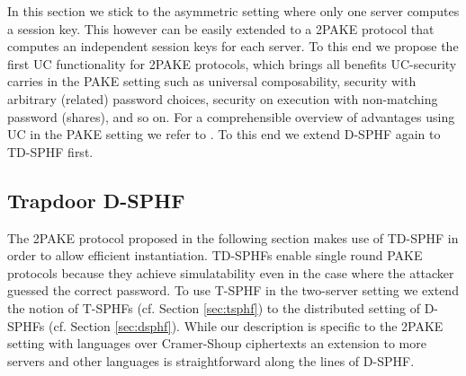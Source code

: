 In this section we stick to the asymmetric setting where only one server computes a session key.
This however can be easily extended to a \ac{2PAKE} protocol that computes an independent session keys for each server.
To this end we propose the first \ac{UC} functionality for \ac{2PAKE} protocols, which brings all benefits \ac{UC}-security carries in the \ac{PAKE} setting such as universal composability, security with arbitrary (related) password choices, security on execution with non-matching password (shares), and so on.
For a comprehensible overview of advantages using \ac{UC} in the \ac{PAKE} setting we refer to \citet{Canetti2005}.
To this end we extend \ac{D-SPHF} again to \ac{TD-SPHF} first.


\subsection{Trapdoor D-SPHF}\label{sec:tdsphf}
The \ac{2PAKE} protocol proposed in the following section makes use of \ac{TD-SPHF} in order to allow efficient instantiation.
\acp{TD-SPHF} enable single round \ac{PAKE} protocols because they achieve simulatability even in the case where the attacker guessed the correct password.
To use \ac{T-SPHF} in the two-server setting we extend the notion of \acp{T-SPHF} (cf. Section \ref{sec:tsphf}) to the distributed setting of \acp{D-SPHF} (cf. Section \ref{sec:dsphf}).
While our description is specific to the \ac{2PAKE} setting with languages over Cramer-Shoup ciphertexts an extension to more servers and other languages is straightforward along the lines of \ac{D-SPHF}.

